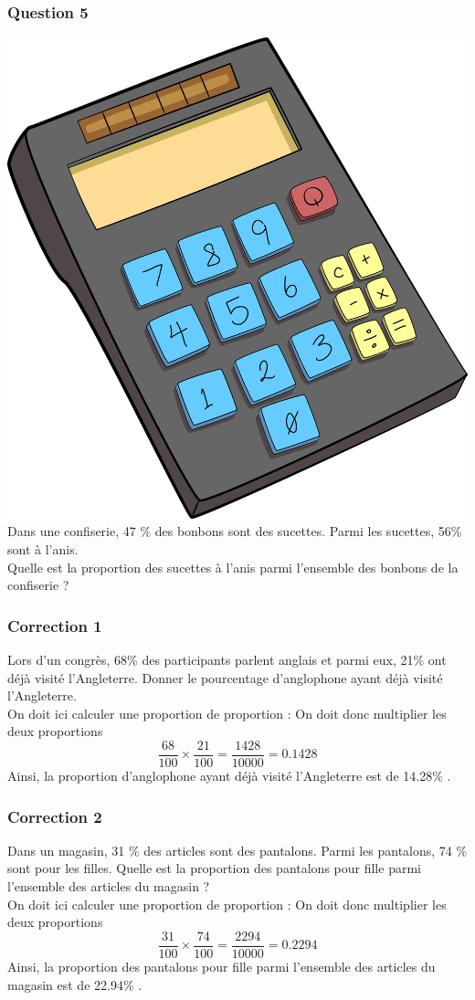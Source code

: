 \documentclass[15pt, mathserif]{beamer}
\begin{document}
\begin{frame} 
	\frametitle{Question 5}
\includegraphics[scale=0.01]{calculatrice} Dans une confiserie, 47 \% des bonbons sont des sucettes. Parmi les sucettes, 56\% sont à l'anis. \\ Quelle est la proportion des sucettes à l'anis parmi l'ensemble des bonbons de la confiserie ?\end{frame}


\begin{frame}
\vspace{-10mm}
	\frametitle{Correction 1}
Lors d'un congrès, 68\% des participants parlent anglais et parmi eux, 21\% ont déjà visité l'Angleterre. Donner le pourcentage d'anglophone ayant déjà visité l'Angleterre. \\ On doit ici calculer une proportion de proportion : On doit donc multiplier les deux proportions $$ \dfrac{68}{100} \times \dfrac{21}{100} = \dfrac{1428}{10000} = 0.1428$$ Ainsi, la proportion d'anglophone ayant déjà visité l'Angleterre est de 14.28\% .\end{frame}


\begin{frame}
\vspace{-10mm}
	\frametitle{Correction 2}
Dans un magasin, 31 \% des articles sont des pantalons. Parmi les pantalons, 74 \% sont pour les filles. Quelle est la proportion des pantalons pour fille parmi l'ensemble des articles du magasin ? \\ On doit ici calculer une proportion de proportion : On doit donc multiplier les deux proportions $$ \dfrac{31}{100} \times \dfrac{74}{100} = \dfrac{2294}{10000} = 0.2294$$ Ainsi, la proportion des pantalons pour fille parmi l'ensemble des articles du magasin  est de 22.94\% .\end{frame}
\end{document}
